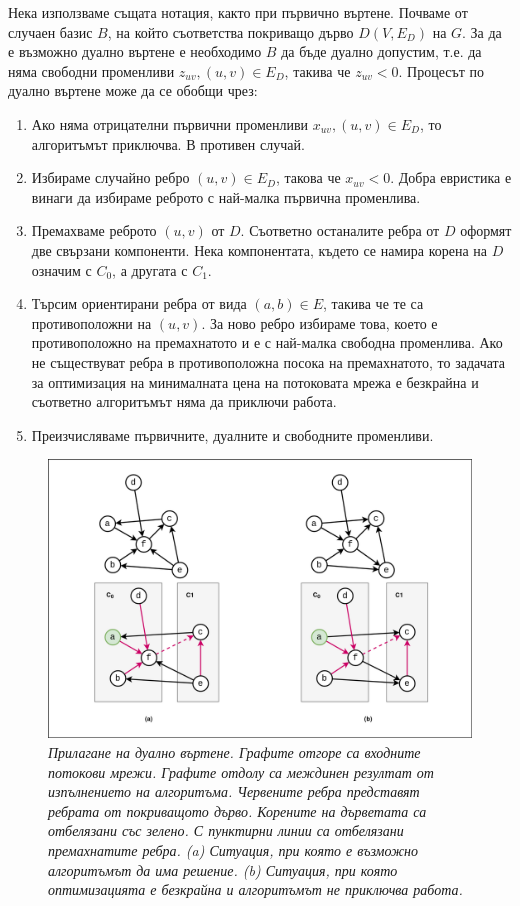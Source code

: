 \documentclass[a4paper,12pt]{article}
\begin{document}
\bigbreak

Нека използваме същата нотация, както при първично въртене. Почваме от случаен базис $B$, на който съответства покриващо дърво $D(V, E_D)$ на $G$. За да е възможно дуално въртене е необходимо $B$ да бъде дуално допустим, т.е. да няма свободни променливи $z_{uv}, (u, v) \in E_D$, такива че $z_{uv} < 0$. Процесът по дуално въртене може да се обобщи чрез:

\begin{enumerate}
    \item Ако няма отрицателни първични променливи $x_{uv}, (u, v) \in E_D$, то алгоритъмът приключва. В противен случай.
    \item Избираме случайно ребро $(u, v) \in E_D$, такова че $x_{uv} < 0$. Добра евристика е винаги да избираме реброто с най-малка първична променлива.
    \item Премахваме реброто $(u, v)$ от $D$. Съответно останалите ребра от $D$ оформят две свързани компоненти. Нека компонентата, където се намира корена на $D$ означим с $C_0$, а другата с $C_1$.
    \item Търсим ориентирани ребра от вида $(a, b) \in E$, такива че те са противоположни на $(u, v)$. За ново ребро избираме това, което е противоположно на премахнатото и е с най-малка свободна променлива. Ако не съществуват ребра в противоположна посока на премахнатото, то задачата за оптимизация на минималната цена на потоковата мрежа е безкрайна и съответно алгоритъмът няма да приключи работа.
    \item Преизчисляваме първичните, дуалните и свободните променливи.
\end{enumerate}

\begin{figure}[ht]
    \centering
    \includegraphics[width=\textwidth]{dualpivotsets.png}
    \caption{\textit{Прилагане на дуално въртене. Графите отгоре са входните потокови мрежи. Графите отдолу са междинен резултат от изпълнението на алгоритъма. Червените ребра представят ребрата от покриващото дърво. Корените на дърветата са отбелязани със зелено. С пунктирни линии са отбелязани премахнатите ребра. (a) Ситуация, при която е възможно алгоритъмът да има решение. (b) Ситуация, при която оптимизацията е безкрайна и алгоритъмът не приключва работа.}}
    \label{fig:dualpivotsets}
\end{figure}
\end{document}

